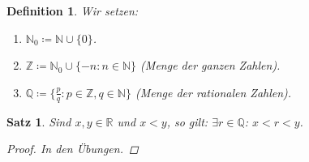 \documentclass[12pt]{extreport} %
\newcommand{\N}{\mathbb{N}}
\newcommand{\Q}{\mathbb{Q}}
\newcommand{\R}{\mathbb{R}}
\newcommand{\Z}{\mathbb{Z}}
\theoremstyle{named}
\theoremstyle{itshape}
\newtheorem{satz}[unnamedtheorem]{Satz}
\newtheorem*{definition}{Definition}
\theoremstyle{normal}
\begin{document}
  
\begin{definition} Wir setzen:
	\begin{enumerate}
		\item $\N_{0} \coloneqq \N \cup \{ 0 \}$.
		\item $\Z \coloneqq \N_{0} \cup \{ - n : n \in \N \}$ (Menge der ganzen Zahlen).
		\item $\Q \coloneqq \{ \frac{p}{q} : p \in \Z, q \in \N \}$ (Menge der rationalen Zahlen).
	\end{enumerate}
\end{definition}


\begin{satz} \label{1.5:satz}
	Sind $x, y \in \R$ und $x < y$, so gilt: $\exists r \in \Q$: $x < r < y$.	

	\begin{proof}
		In den Übungen.
	\end{proof}
\end{satz}

   
\end{document}
